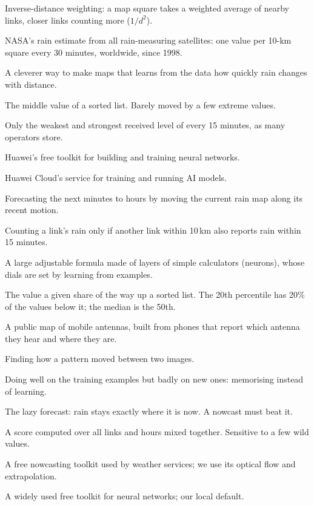 \begin{description}[leftmargin=3.2cm,style=nextline,itemsep=0.25em]
\item[IDW] Inverse-distance weighting: a map square takes a weighted average of nearby links, closer links counting more ($1/d^2$).
\item[IMERG] NASA's rain estimate from all rain-measuring satellites: one value per 10-km square every 30 minutes, worldwide, since 1998.
\item[Kriging] A cleverer way to make maps that learns from the data how quickly rain changes with distance.
\item[Median] The middle value of a sorted list. Barely moved by a few extreme values.
\item[Min/max data] Only the weakest and strongest received level of every 15 minutes, as many operators store.
\item[MindSpore] Huawei's free toolkit for building and training neural networks.
\item[ModelArts] Huawei Cloud's service for training and running AI models.
\item[Nowcasting] Forecasting the next minutes to hours by moving the current rain map along its recent motion.
\item[Neighbour check] Counting a link's rain only if another link within 10\,km also reports rain within 15 minutes.
\item[Neural network] A large adjustable formula made of layers of simple calculators (neurons), whose dials are set by learning from examples.
\item[Percentile] The value a given share of the way up a sorted list. The 20th percentile has 20\% of the values below it; the median is the 50th.
\item[OpenCelliD] A public map of mobile antennas, built from phones that report which antenna they hear and where they are.
\item[Optical flow] Finding how a pattern moved between two images.
\item[Overfitting] Doing well on the training examples but badly on new ones: memorising instead of learning.
\item[Persistence] The lazy forecast: rain stays exactly where it is now. A nowcast must beat it.
\item[Pooled score] A score computed over all links and hours mixed together. Sensitive to a few wild values.
\item[pysteps] A free nowcasting toolkit used by weather services; we use its optical flow and extrapolation.
\item[PyTorch] A widely used free toolkit for neural networks; our local default.

\end{description}
